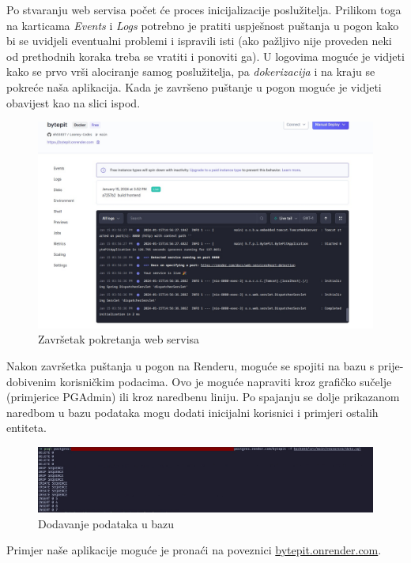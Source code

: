 \begin{itemize}
	Po stvaranju web servisa počet će proces inicijalizacije poslužitelja. Prilikom toga na karticama \textit{Events} i \textit{Logs} potrebno je pratiti uspješnost puštanja u pogon kako bi se uvidjeli eventualni problemi i ispravili isti (ako pažljivo nije proveden neki od prethodnih koraka treba se vratiti i ponoviti ga). U logovima moguće je vidjeti kako se prvo vrši alociranje samog poslužitelja, pa \textit{dokerizacija} i na kraju se pokreće naša aplikacija. Kada je završeno puštanje u pogon moguće je vidjeti obavijest kao na slici ispod.
	\begin{figure}[H]
		\includegraphics[scale=0.3]{slike/deployment4.jpeg}
		\centering
		\caption{Završetak pokretanja web servisa}
		\label{deployment4}
	\end{figure}
\end{itemize}

Nakon završetka puštanja u pogon na Renderu, moguće se spojiti na bazu s prije-dobivenim korisničkim podacima. Ovo je moguće napraviti kroz grafičko sučelje (primjerice PGAdmin) ili kroz naredbenu liniju. Po spajanju se dolje prikazanom naredbom u bazu podataka mogu dodati inicijalni korisnici i primjeri ostalih entiteta.

\begin{figure}[H]
	\includegraphics[scale=0.25]{slike/deployment5.jpeg}
	\centering
	\caption{Dodavanje podataka u bazu}
	\label{deployment5}
\end{figure}

Primjer naše aplikacije moguće je pronaći na poveznici \href{https://bytepit.onrender.com/}{bytepit.onrender.com}. 


\eject 
